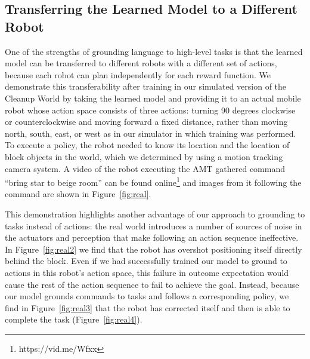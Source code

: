 \documentclass[conference]{IEEEtran}
\begin{document}
\subsection{Transferring the Learned Model to a Different Robot}
One of the strengths of grounding language to high-level tasks is that the learned model can be transferred to different robots with a different set of actions, because each robot can plan independently for each reward function. We demonstrate this transferability after training in our simulated version of the Cleanup World by taking the learned model and providing it to an actual mobile robot whose action space consists of three actions: turning 90 degrees clockwise or counterclockwise and moving forward a fixed distance, rather than moving north, south, east, or west as in our simulator in which training was performed. To execute a policy, the robot needed to know its location and the location of block objects in the world, which we determined by using a motion tracking camera system. A video of the robot executing the AMT gathered command ``bring star to beige room'' can be found online\footnote{https://vid.me/Wfxx} and images from it following the command are shown in Figure~\ref{fig:real}.

This demonstration highlights another advantage of our approach to grounding to tasks instead of actions: the real world introduces a number of sources of noise in the actuators and perception that make following an action sequence ineffective. In Figure~\ref{fig:real2} we find that the robot has overshot positioning itself directly behind the block. Even if we had successfully trained our model to ground to actions in this robot's action space, this failure in outcome expectation would cause the rest of the action sequence to fail to achieve the goal. Instead, because our model grounds commands to tasks and follows a corresponding policy, we find in Figure~\ref{fig:real3} that the robot has corrected itself and then is able to complete the task (Figure~\ref{fig:real4}).
\end{document}
